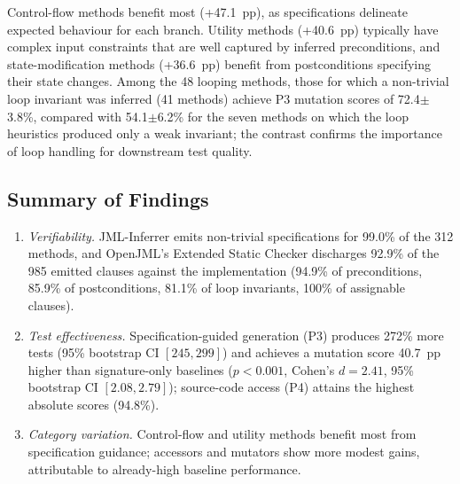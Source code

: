 Control-flow methods benefit most (+47.1~pp), as specifications delineate expected behaviour for each branch. Utility methods (+40.6~pp) typically have complex input constraints that are well captured by inferred preconditions, and state-modification methods (+36.6~pp) benefit from postconditions specifying their state changes. Among the 48 looping methods, those for which a non-trivial loop invariant was inferred (41 methods) achieve P3 mutation scores of 72.4$\pm$3.8\%, compared with 54.1$\pm$6.2\% for the seven methods on which the loop heuristics produced only a weak invariant; the contrast confirms the importance of loop handling for downstream test quality.

\subsection{Summary of Findings}

\begin{enumerate}
    \item \emph{Verifiability.} JML-Inferrer emits non-trivial specifications for 99.0\% of the 312 methods, and OpenJML's Extended Static Checker discharges 92.9\% of the 985 emitted clauses against the implementation (94.9\% of preconditions, 85.9\% of postconditions, 81.1\% of loop invariants, 100\% of assignable clauses).

    \item \emph{Test effectiveness.} Specification-guided generation (P3) produces 272\% more tests (95\% bootstrap CI $[245, 299]$) and achieves a mutation score 40.7~pp higher than signature-only baselines ($p < 0.001$, Cohen's $d = 2.41$, 95\% bootstrap CI $[2.08, 2.79]$); source-code access (P4) attains the highest absolute scores (94.8\%).

    \item \emph{Category variation.} Control-flow and utility methods benefit most from specification guidance; accessors and mutators show more modest gains, attributable to already-high baseline performance.
\end{enumerate}
